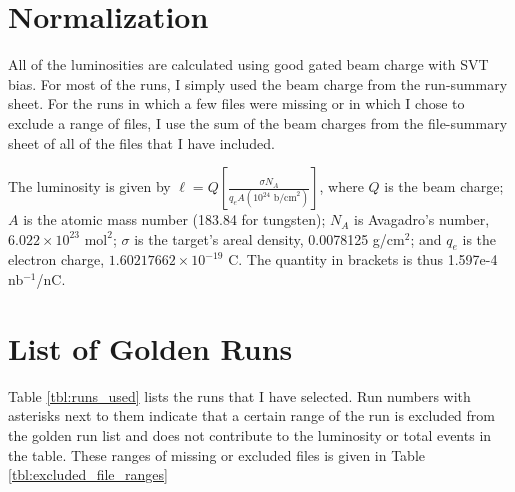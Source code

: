 \documentclass[11pt]{article}
\begin{document}
\section{Normalization}
All of the luminosities are calculated using good gated beam charge with SVT bias.  For most of the runs, I simply used the beam charge from the run-summary sheet.  For the runs in which a few files were missing or in which I chose to exclude a range of files, I use the sum of the beam charges from the file-summary sheet of all of the files that I have included.  


The luminosity is given by $\ell = Q \left[\frac{\sigma N_A}{q_eA(10^{24}\textrm{ b/cm}^2)}\right]$, where $Q$ is the beam charge; $A$ is the atomic mass number (183.84 for tungsten); $N_A$ is Avagadro's number, $6.022\times 10^{23}\textrm{ mol}^2$; $\sigma$ is the target's areal density, 0.0078125 g/cm$^2$; and $q_e$ is the electron charge, $1.60217662 \times 10^{-19}$ C.  The quantity in brackets is thus 1.597e-4 nb$^{-1}$/nC.

\section{List of Golden Runs}
Table \ref{tbl:runs_used} lists the runs that I have selected.  Run numbers with asterisks next to them indicate that a certain range of the run is excluded from the golden run list and does not contribute to the luminosity or total events in the table.  These ranges of missing or excluded files is given in Table \ref{tbl:excluded_file_ranges}
\end{document}
